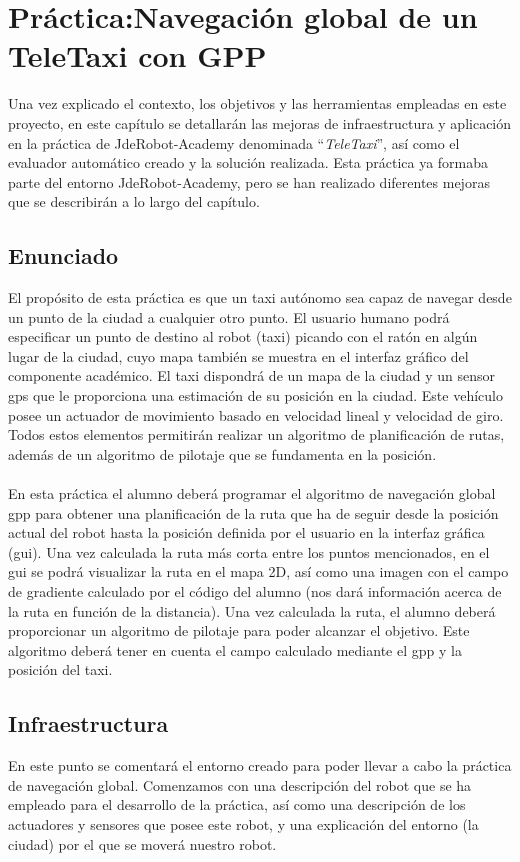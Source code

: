 \chapter{Práctica:Navegación global de un TeleTaxi con GPP}\label{cap.gpp}
 Una vez explicado el contexto, los objetivos y las herramientas empleadas en este proyecto, en este capítulo se detallarán las mejoras de infraestructura y aplicación en la práctica de JdeRobot-Academy denominada ``\textit{TeleTaxi}'', así como el evaluador automático creado y la solución realizada. Esta práctica ya formaba parte del entorno JdeRobot-Academy, pero se han realizado diferentes mejoras que se describirán a lo largo del capítulo.

\section{Enunciado} \label{sec.enunciado}
El propósito de esta práctica es que un taxi autónomo sea capaz de navegar desde un punto de la ciudad a cualquier otro punto. El usuario humano podrá especificar un punto de destino al robot (taxi) picando con el ratón en algún lugar de la ciudad, cuyo mapa también se muestra en el interfaz gráfico del componente académico. El taxi dispondrá de un mapa de la ciudad y un sensor \acrfull{gps} que le proporciona una estimación de su posición en la ciudad. Este vehículo posee un actuador de movimiento basado en velocidad lineal y velocidad de giro. Todos estos elementos permitirán realizar un algoritmo de planificación de rutas, además de un algoritmo de pilotaje que se fundamenta en la posición.\\ \\

En esta práctica el alumno deberá programar el algoritmo de navegación global \acrfull{gpp} para obtener una planificación de la ruta que ha de seguir desde la posición actual del robot hasta la posición definida por el usuario en la interfaz gráfica (\acrshort{gui}). Una vez calculada la ruta más corta entre los puntos mencionados, en el \acrshort{gui} se podrá visualizar la ruta en el mapa 2D, así como una imagen con el campo de gradiente calculado por el código del alumno (nos dará información acerca de la ruta en función de la distancia). Una vez calculada la ruta, el alumno deberá proporcionar un algoritmo de pilotaje para poder alcanzar el objetivo. Este algoritmo deberá tener en cuenta el campo calculado mediante el \acrshort{gpp} y la posición del taxi. 

\section{Infraestructura}
En este punto se comentará el entorno creado para poder llevar a cabo la práctica de navegación global. Comenzamos con una descripción del robot que se ha empleado para el desarrollo de la práctica, así como una descripción de los actuadores y sensores que posee este robot, y una explicación del entorno (la ciudad) por el que se moverá nuestro robot.

